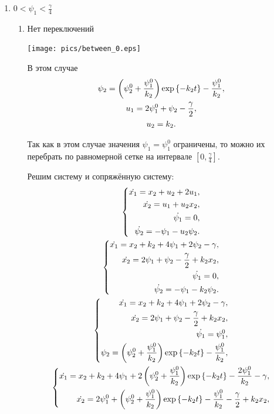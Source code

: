 \documentclass[11pt]{article}
\begin{document}
\begin{enumerate}
\begin{enumerate}
\end{enumerate}
\item $0 < \psi_1 < \tfrac{\gamma}{4}$ %

\begin{enumerate}
\item
Нет переключений

\texttt{[image: pics/between\_0.eps]}

В этом случае
\begin{gather}
\psi_2 = \left( \psi_2^0 + \frac{\psi_1^0}{k_2} \right) \exp \left\{ -k_2t \right\} - \frac{\psi_1^0}{k_2}, \notag \\
u_1 = 2\psi_1^0 + \psi_2 - \frac{\gamma}{2}, \notag \\
u_2 = k_2. \notag
\end{gather}

Так как в этом случае значения $\psi_1 = \psi_1^0$ ограничены, то можно их перебрать по равномерной сетке на интервале $[0, \tfrac{\gamma}{4}]$.

Решим систему и сопряжённую систему:
\begin{gather}
\left\{ 
\begin{aligned}
\dot{x_1} = x_2 + u_2 + 2u_1, \\
\dot{x_2} = u_1 + u_2 x_2, \\
\dot{\psi_1} = 0, \\
\dot{\psi_2} = -\psi_1 - u_2 \psi_2.
\end{aligned}
\right. \notag \\
\left\{ 
\begin{aligned}
\dot{x_1} = x_2 + k_2 + 4\psi_1 + 2\psi_2 - \gamma, \\
\dot{x_2} = 2\psi_1 + \psi_2 - \frac{\gamma}{2} + k_2 x_2, \\
\dot{\psi_1} = 0, \\
\dot{\psi_2} = -\psi_1 - k_2 \psi_2.
\end{aligned}
\right. \notag \\
\left\{ 
\begin{aligned}
\dot{x_1} = x_2 + k_2 + 4\psi_1 + 2\psi_2 - \gamma, \\
\dot{x_2} = 2\psi_1 + \psi_2 - \frac{\gamma}{2} + k_2 x_2, \\
\dot{\psi_1} = \psi_1^0, \\
\psi_2 = \left( \psi_2^0 + \frac{\psi_1^0}{k_2} \right) \exp \left\{ -k_2t \right\} - \frac{\psi_1^0}{k_2}, \\
\end{aligned}
\right. \notag \\
\left\{ 
\begin{aligned}
\dot{x_1} = x_2 + k_2 + 4\psi_1 + 2\left( \psi_2^0 + \frac{\psi_1^0}{k_2} \right) \exp \left\{ -k_2t \right\} - \frac{2\psi_1^0}{k_2} - \gamma, \\
\dot{x_2} = 2\psi_1^0 + \left( \psi_2^0 + \frac{\psi_1^0}{k_2} \right) \exp \left\{ -k_2t \right\} - \frac{\psi_1^0}{k_2} - \frac{\gamma}{2} + k_2 x_2, \\
\end{aligned}
\right. \notag
\end{gather}


\end{enumerate}
\end{enumerate}
\end{document}

